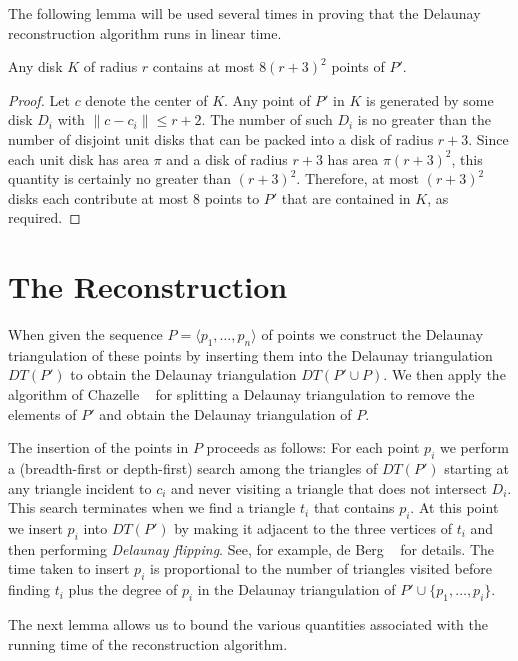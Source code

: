 \documentclass[lotsofwhite]{patmorin}
\begin{document}
The following lemma will be used several times in proving that the
Delaunay reconstruction algorithm runs in linear time.

\begin{lem}
Any disk $K$ of radius $r$ contains at most $8(r+3)^2$ points of $P'$.
\end{lem}

\begin{proof}
Let $c$ denote the center of $K$.  Any point of $P'$ in $K$ is
generated by some disk $D_i$ with $\|c -
c_i\| \le r+2$.  The number of such $D_i$ is no greater than the
number of disjoint unit disks that can be packed into a disk of radius
$r+3$.  Since each unit disk has area $\pi$ and a disk of radius $r+3$
has area $\pi (r+3)^2$, this quantity is certainly no greater than
$(r+3)^2$.  Therefore, at most $(r+3)^2$ disks each contribute at most
$8$ points to $P'$ that are contained in $K$, as required.
\end{proof}


\section{The Reconstruction}

When given the sequence $P=\langle p_1,\ldots,p_n\rangle$ of points we
construct the Delaunay triangulation of these points by inserting them
into the Delaunay triangulation $DT(P')$ to obtain the Delaunay
triangulation $DT(P'\cup P)$. We then apply the algorithm of Chazelle
\etal\ \cite{cdhmst02} for splitting a Delaunay triangulation to remove the
elements of $P'$ and obtain the Delaunay triangulation of $P$.

The insertion of the points in $P$ proceeds as follows: For each point
$p_i$ we perform a (breadth-first or depth-first) search among the
triangles of $DT(P')$ starting at any triangle incident to $c_i$ and
never visiting a triangle that does not intersect $D_i$.  This search
terminates when we find a triangle $t_i$ that contains $p_i$.  At
this point we insert $p_i$ into $DT(P')$ by making it adjacent to the
three vertices of $t_i$ and then performing \emph{Delaunay flipping}.
See, for example, de Berg \etal\ \cite[Section~9.3]{bcko08} for
details.  The time taken to insert $p_i$ is proportional to the number
of triangles visited before finding $t_i$ plus the degree of $p_i$ in
the Delaunay triangulation of $P'\cup\{p_1,\ldots,p_i\}$.

The next lemma allows us to bound the various quantities
associated with the running time of the reconstruction algorithm.
\end{document}
